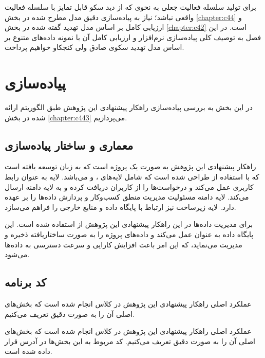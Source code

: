 
برای تولید سلسله فعالیت جعلی به نحوی که از دید سکو قابل تمایز با سلسله فعالیت واقعی نباشد؛ نیاز به پیاده‌سازی دقیق مدل مطرح شده در بخش \ref{chapter:c44} و ارزیابی کامل بر اساس مدل تهدید گفته شده در بخش \ref{chapter:c42} است. در این فصل به توصیف کلی پیاده‌سازی نرم‌افزار و ارزیابی کامل آن با نمونه داده‌های متنوع بر اساس مدل تهدید سکوی صادق ولی کنجکاو خواهیم پرداخت.

\section{پیاده‌سازی}

در این بخش به بررسی پیاده‌سازی راهکار پیشنهادی این پژوهش طبق الگوریتم ارائه شده در بخش \ref{chapter:c443} می‌پردازیم.

\subsection{معماری و ساختار پیاده‌سازی}

راهکار پیشنهادی این پژوهش به صورت یک پروژه  است که به زبان  توسعه یافته است که با استفاده از  طراحی شده است که شامل لایه‌های ،  و  می‌باشد. لایه  به عنوان رابط کاربری عمل می‌کند و درخواست‌ها را از کاربران دریافت کرده و به لایه دامنه ارسال می‌کند. لایه دامنه مسئولیت مدیریت منطق کسب‌وکار و پردازش داده‌ها را بر عهده دارد. لایه زیرساخت نیز ارتباط با پایگاه داده و منابع خارجی را فراهم می‌سازد.

برای مدیریت داده‌ها در این راهکار پیشنهادی این پژوهش از  استفاده شده است. این پایگاه داده به عنوان  عمل می‌کند و داده‌های پروژه را به صورت ساختاریافته ذخیره و مدیریت می‌نماید، که این امر باعث افزایش کارایی و سرعت دسترسی به داده‌ها می‌شود.

\subsection{کد برنامه}

عملکرد اصلی راهکار پیشنهادی این پژوهش در کلاس  انجام شده است که بخش‌های اصلی آن را به صورت دقیق تعریف می‌کنیم.

عملکرد اصلی راهکار پیشنهادی این پژوهش در کلاس  انجام شده است که بخش‌های اصلی آن را به صورت دقیق تعریف می‌کنیم. کد مربوط به این بخش‌ها در آدرس  قرار داده شده است.



